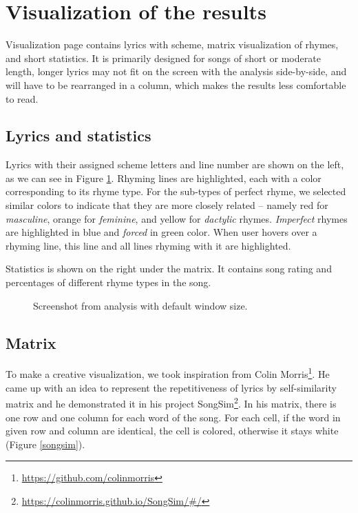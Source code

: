 \section{Visualization of the results}
Visualization page contains lyrics with scheme, matrix visualization of rhymes, and short statistics. It is primarily designed for songs of short or moderate length, longer lyrics may not fit on the screen with the analysis side-by-side, and will have to be rearranged in a column, which makes the results less comfortable to read.

\subsection{Lyrics and statistics}\label{sec-lyrics_and_stats}
Lyrics with their assigned scheme letters and line number are shown on the left, as we can see in Figure \ref{web-analysis_window5}. Rhyming lines are highlighted, each with a color corresponding to its rhyme type. For the sub-types of perfect rhyme, we selected similar colors to indicate that they are more closely related -- namely red for \textit{masculine}, orange for \textit{feminine}, and yellow for \textit{dactylic} rhymes. \textit{Imperfect} rhymes are highlighted in blue and \textit{forced} in green color. When user hovers over a rhyming line, this line and all lines rhyming with it are highlighted.

Statistics is shown on the right under the matrix. It contains song rating and percentages of different rhyme types in the song.

\begin{figure}[h]\centering
	\caption{Screenshot from analysis with default window size.}
	\label{web-analysis_window5}
\end{figure}

\subsection{Matrix}
To make a creative visualization, we took inspiration from Colin Morris\footnote{\url{https://github.com/colinmorris}}. He came up with an idea to represent the repetitiveness of lyrics by self-similarity matrix and he demonstrated it in his project SongSim\footnote{\url{https://colinmorris.github.io/SongSim/\#/}}. In his matrix, there is one row and one column for each word of the song. For each cell, if the word in given row and column are identical, the cell is colored, otherwise it stays white (Figure \ref{songsim}).

